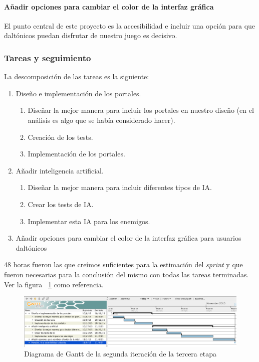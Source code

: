 \paragraph{Añadir opciones para cambiar el color de la interfaz gráfica} El punto central de este proyecto es la accesibilidad e incluir una opción para que daltónicos puedan disfrutar de nuestro juego es decisivo.

\subsubsection{Tareas y seguimiento}

La descomposición de las tareas es la siguiente:

\begin{enumerate}[label=\bfseries WBS 2.\arabic*]
  \item Diseño e implementación de los portales.
    \begin{enumerate}[label=\bfseries WBS 2.1.\arabic*]
      \item Diseñar la mejor manera para incluir los portales en nuestro diseño (en el análisis es algo que se había considerado hacer).
      \item Creación de los tests.
      \item Implementación de los portales.
    \end{enumerate}
  \item Añadir inteligencia artificial.
  	\begin{enumerate}[label=\bfseries WBS 2.2.\arabic*]
      \item Diseñar la mejor manera para incluir diferentes tipos de IA.
      \item Crear los tests de IA.
      \item Implementar esta IA para los enemigos.
    \end{enumerate}
  \item Añadir opciones para cambiar el color de la interfaz gráfica para usuarios daltónicos
\end{enumerate}

48 horas fueron las que creímos suficientes para la estimación del \textit{sprint} y que fueron necesarias para la conclusión del mismo con todas las tareas terminadas. Ver la figura ~\ref{fig:sec3it2} como referencia.

\begin{figure}
    \includegraphics[width=\textwidth,height=\textheight,keepaspectratio]{./img/sec3it2.png}
  \caption{Diagrama de Gantt de la segunda iteración de la tercera etapa}
  \label{fig:sec3it2}
\end{figure}

